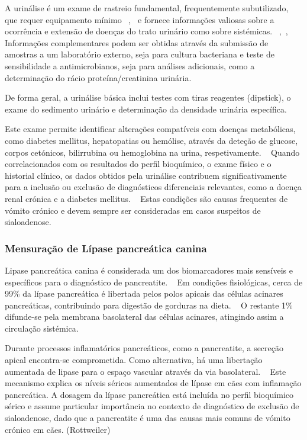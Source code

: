 A urinálise é um exame de rastreio fundamental, frequentemente subutilizado, que requer equipamento mínimo ~\cite{Ristic2011},~\cite{Kumar2017} e fornece informações valiosas sobre a ocorrência e extensão de doenças do trato urinário como sobre sistémicas. ~\cite{Ristic2011},~\cite{Yadav2020},~\cite{Reine2005} Informações complementares podem ser obtidas através da submissão de amostras a um laboratório externo, seja para cultura bacteriana e teste de sensibilidade a antimicrobianos, seja para análises adicionais, como a determinação do rácio proteína/creatinina urinária. ~\cite{Ristic2011} 


De forma geral, a urinálise básica inclui testes com tiras reagentes (dipstick), o exame do sedimento urinário e determinação da densidade urinária específica. ~\cite{Ristic2011} 


Este exame permite identificar alterações compatíveis com doenças metabólicas, como diabetes mellitus, hepatopatias ou hemólise, através da deteção de glucose, corpos cetónicos, bilirrubina ou hemoglobina na urina, respetivamente. ~\cite{Parrah2013} 
Quando correlacionados com os resultados do perfil bioquímico, o exame físico e o historial clínico, os dados obtidos pela urinálise contribuem significativamente para a inclusão ou exclusão de diagnósticos diferenciais relevantes, como a doença renal crónica e a diabetes mellitus. ~\cite{Reine2005} Estas condições são causas frequentes de vómito crónico e devem sempre ser consideradas em casos suspeitos de sialoadenose.


\subsubsection{Mensuração de Lípase pancreática canina}

Lipase pancreática canina é considerada um dos biomarcadores mais sensíveis e específicos para o diagnóstico de pancreatite. ~\cite{Kim2024} Em condições fisiológicas, cerca de 99\% da lípase pancreática é libertada pelos polos apicais das células acinares pancreáticas, contribuindo para digestão de gorduras na dieta. ~\cite{Lim2022} O restante 1\% difunde-se pela membrana basolateral das células acinares, atingindo assim a circulação sistémica.~\cite{Lim2022}


Durante processos inflamatórios pancreáticos, como a pancreatite, a secreção apical encontra-se comprometida. Como alternativa, há uma libertação aumentada de lipase para o espaço vascular através da via basolateral. ~\cite{Lim2022} Este mecanismo explica os níveis séricos aumentados de lípase em cães com inflamação pancreática.
A dosagem da lípase pancreática está incluída no perfil bioquímico sérico e assume particular importância no contexto de diagnóstico de exclusão de sialoadenose, dado que a pancreatite é uma das causas mais comuns de vómito crónico em cães. (Rottweiler) 


